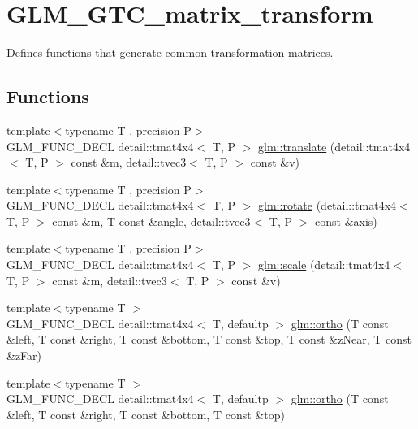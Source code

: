 \hypertarget{group__gtc__matrix__transform}{}\section{G\+L\+M\+\_\+\+G\+T\+C\+\_\+matrix\+\_\+transform}
\label{group__gtc__matrix__transform}


Defines functions that generate common transformation matrices.  


\subsection*{Functions}
\begin{DoxyCompactItemize}
\item 
{\footnotesize template$<$typename T , precision P$>$ }\\G\+L\+M\+\_\+\+F\+U\+N\+C\+\_\+\+D\+E\+CL detail\+::tmat4x4$<$ T, P $>$ \hyperlink{group__gtc__matrix__transform_ga1501de0fa580dcc491b67e0685bbc7c2}{glm\+::translate} (detail\+::tmat4x4$<$ T, P $>$ const \&m, detail\+::tvec3$<$ T, P $>$ const \&v)
\item 
{\footnotesize template$<$typename T , precision P$>$ }\\G\+L\+M\+\_\+\+F\+U\+N\+C\+\_\+\+D\+E\+CL detail\+::tmat4x4$<$ T, P $>$ \hyperlink{group__gtc__matrix__transform_ga61e65a3bb227c267d1a15113d1056fb1}{glm\+::rotate} (detail\+::tmat4x4$<$ T, P $>$ const \&m, T const \&angle, detail\+::tvec3$<$ T, P $>$ const \&axis)
\item 
{\footnotesize template$<$typename T , precision P$>$ }\\G\+L\+M\+\_\+\+F\+U\+N\+C\+\_\+\+D\+E\+CL detail\+::tmat4x4$<$ T, P $>$ \hyperlink{group__gtc__matrix__transform_gabd40959f269abd16c256a4f59ab03d62}{glm\+::scale} (detail\+::tmat4x4$<$ T, P $>$ const \&m, detail\+::tvec3$<$ T, P $>$ const \&v)
\item 
{\footnotesize template$<$typename T $>$ }\\G\+L\+M\+\_\+\+F\+U\+N\+C\+\_\+\+D\+E\+CL detail\+::tmat4x4$<$ T, defaultp $>$ \hyperlink{group__gtc__matrix__transform_gac393e9262776e4980731c386123e4377}{glm\+::ortho} (T const \&left, T const \&right, T const \&bottom, T const \&top, T const \&z\+Near, T const \&z\+Far)
\item 
{\footnotesize template$<$typename T $>$ }\\G\+L\+M\+\_\+\+F\+U\+N\+C\+\_\+\+D\+E\+CL detail\+::tmat4x4$<$ T, defaultp $>$ \hyperlink{group__gtc__matrix__transform_gab03587bce3510aa5d2f4e5f1be6c2370}{glm\+::ortho} (T const \&left, T const \&right, T const \&bottom, T const \&top)

\end{DoxyCompactItemize}
